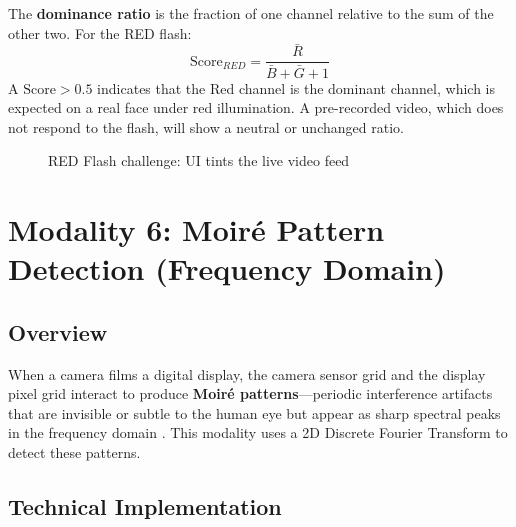 \documentclass[12pt,a4paper]{report}
\begin{document}
The \textbf{dominance ratio} is the fraction of one channel relative to the sum of the other two. For the RED flash:
\[
\text{Score}_{RED} = \frac{\bar{R}}{\bar{B} + \bar{G} + 1}
\]
A $\text{Score} > 0.5$ indicates that the Red channel is the dominant channel, which is expected on a real face under red illumination. A pre-recorded video, which does not respond to the flash, will show a neutral or unchanged ratio.

\begin{figure}[H]
    \centering
    \caption{RED Flash challenge: UI tints the live video feed}
    \label{fig:flash}
\end{figure}

\chapter{Modality 6: Moir\'{e} Pattern Detection (Frequency Domain)}

\section{Overview}
When a camera films a digital display, the camera sensor grid and the display pixel grid interact to produce \textbf{Moir\'{e} patterns}---periodic interference artifacts that are invisible or subtle to the human eye but appear as sharp spectral peaks in the frequency domain \cite{nguyen2019}. This modality uses a 2D Discrete Fourier Transform to detect these patterns.

\section{Technical Implementation}
\end{document}
